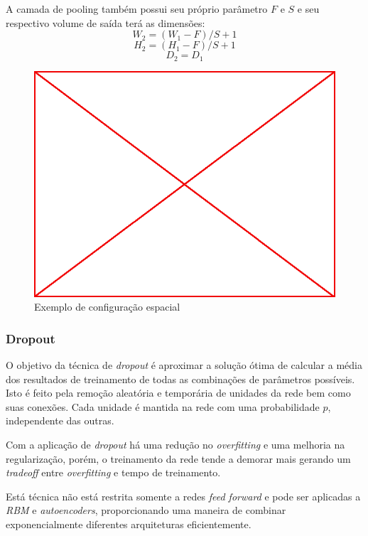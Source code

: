 A camada de pooling também possui seu próprio parâmetro $F$ e $S$ e seu respectivo volume de saída terá as dimensões:
$$W_2 = (W_1 - F)/S + 1$$ 
$$H_2 = (H_1 - F)/S + 1$$ 
$$D_2 = D_1$$ 
\begin{figure}
  \caption{Exemplo de configuração espacial}
  \begin{center}
    \includegraphics[scale=0.5]{placeholder}
  \end{center}
\end{figure}
\subsubsection{Dropout}

O objetivo da técnica de \emph{dropout} é aproximar a solução ótima de calcular
a média dos resultados de treinamento de todas as combinações de parâmetros
possíveis. Isto é feito pela remoção aleatória e temporária de unidades da rede
bem como suas conexões. Cada unidade é mantida na rede com uma probabilidade
$p$, independente das outras.\cite{srivastava2014dropout}

Com a aplicação de \emph{dropout} há uma redução no \emph{overfitting} e uma
melhoria na regularização, porém, o treinamento da rede tende a demorar mais
gerando um \emph{tradeoff} entre \emph{overfitting} e tempo de
treinamento.\cite{srivastava2014dropout}

Está técnica não está restrita somente a redes \emph{feed forward} e pode ser
aplicadas a \emph{RBM} e \emph{autoencoders}, proporcionando uma maneira de
combinar exponencialmente diferentes arquiteturas
eficientemente.\cite{srivastava2014dropout}

